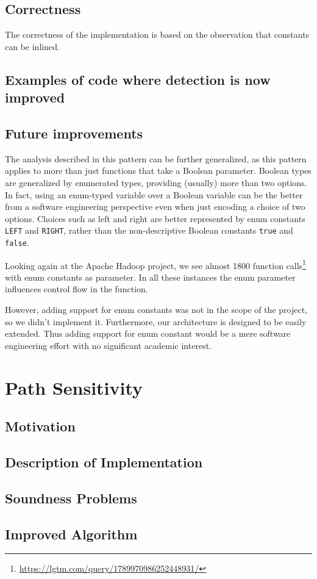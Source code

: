 \subsection{Correctness}
The correctness of the implementation is based on the observation that constants can be
inlined.

\subsection{Examples of code where detection is now improved}
\subsection{Future improvements}
The analysis described in this pattern can be further generalized, as
this pattern applies to more than just functions that take a Boolean parameter.
Boolean types are generalized by enumerated types, providing (usually) more than two options.
In fact, using an enum-typed variable over a Boolean variable can be the better from a software engineering perspective
even when just encoding a choice of two options.
Choices such as left and right are better represented 
by enum constants \texttt{LEFT} and \texttt{RIGHT}, rather than the 
non-descriptive Boolean constants \texttt{true} and \texttt{false}.

Looking again at the Apache Hadoop project, we see almost 1800
function calls\footnote{\url{https://lgtm.com/query/1789970986252448931/}} with enum constants as parameter.
In all these instances the enum parameter influences control flow in the function.

However, adding support for enum constants was not in the scope of the project, so we didn't implement it.
Furthermore, our architecture is designed to be easily extended.
Thus adding support for enum constant would be a mere software engineering effort
with no significant academic interest.


\newpage
\section{Path Sensitivity}
\subsection{Motivation}
\subsection{Description of Implementation}
\subsection{Soundness Problems}
\subsection{Improved Algorithm}




